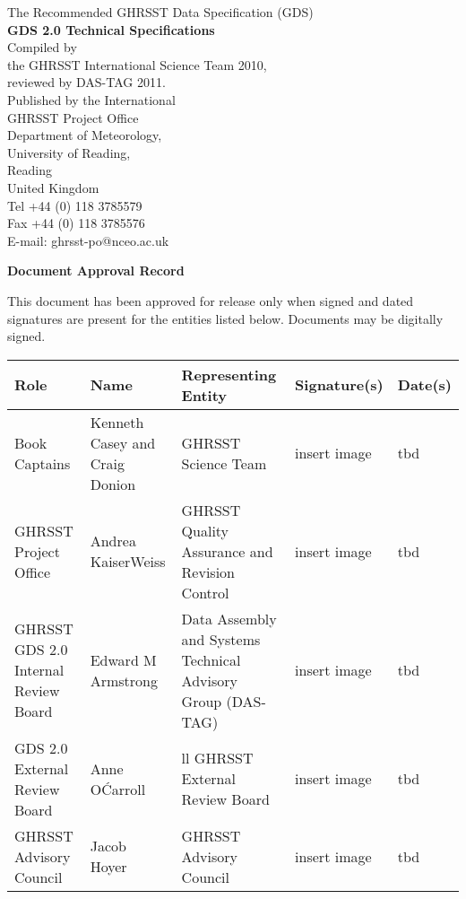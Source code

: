 \pagebreak

\begin{center}
\vspace*{2cm}
{\Large The Recommended
GHRSST Data Specification (GDS)}\\[2cm]
{\LARGE \textbf{GDS 2.0 Technical Specifications}}\\[2cm]{\large Compiled by\\the GHRSST International Science Team 2010,\\reviewed by DAS-TAG 2011.}\\[2cm]
{\large Published by the International \\GHRSST Project Office\\
Department of Meteorology,\\
University of Reading,\\
Reading\\
United Kingdom}\\[2cm]
{\large Tel +44 (0) 118 3785579\\
Fax +44 (0) 118 3785576\\
E-mail: ghrsst-po@nceo.ac.uk}\\[2cm]
\end{center}
\newpage
\textbf{\Large Document Approval Record}\par\vspace{1cm}
This document has been approved for release only when signed and dated signatures are present for
the entities listed below. Documents may be digitally signed. \par \vspace{1cm}
\begin{tabular}{|p{1.5cm}|>{\raggedright}p{2.5cm}|>{\raggedright}p{3cm}|p{4cm}|p{1.5cm}|}
\hline \rowcolor{lightgray}
Role & Name & Representing Entity & Signature(s) & Date(s) \\
\hline
Book Captains & Kenneth Casey and Craig Donion & GHRSST Science Team & insert image & tbd \\
\hline
GHRSST Project Office & Andrea KaiserWeiss & GHRSST Quality Assurance and Revision Control &insert image & tbd \\
\hline
GHRSST GDS 2.0 Internal Review Board & Edward M Armstrong & Data Assembly and Systems Technical Advisory Group (DAS-TAG) & insert image & tbd \\
\hline
GDS 2.0 External Review Board & Anne O\'Carroll & ll GHRSST External Review Board & insert image & tbd \\
\hline
GHRSST Advisory Council & Jacob Hoyer & GHRSST Advisory Council & insert image & tbd \\
\hline
\end{tabular}
